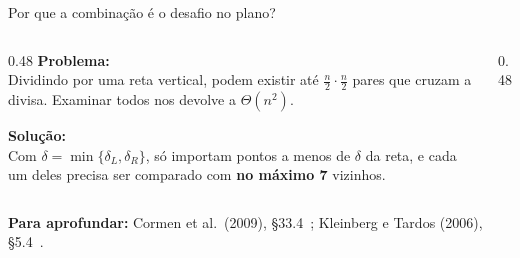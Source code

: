 \documentclass[aspectratio=169,xcolor=table]{beamer}
\newcommand{\pontosexemplo}{%
  \foreach \n/\x/\y/\p in {A/1/5/above left, B/2/9/above left, C/4/5/above left,
      D/5/8/above left, E/6/8/above right, F/8/8/above right, G/10/2/above left,
      H/11/9/above left}{%
    \node[pt] (\n) at (\x,\y) {};
    \node[ptlbl, \p] at (\n) {\n};
  }%
}
\newcommand{\fonte}[1]{%
  \vfill
  {\tiny\color{gray!55!black}\textbf{Para aprofundar:} #1\par}%
}
\begin{document}
\begin{frame}{Por que a combinação é o desafio no plano?}
  \begin{columns}[T]
    \begin{column}{0.48\textwidth}
      \textbf{Problema:}\\[2pt]
      {\scriptsize Dividindo por uma reta vertical, podem existir até
      $\frac n2\cdot\frac n2$ pares que cruzam a divisa. Examinar todos
      nos devolve a $\Theta(n^2)$.}

      \medskip
      \textbf{Solução:}\\[2pt]
      {\scriptsize Com $\delta=\min\{\delta_L,\delta_R\}$, só importam pontos
      a menos de $\delta$ da reta, e cada um deles precisa ser comparado
      com \textbf{no máximo 7} vizinhos.}
    \end{column}
    \begin{column}{0.48\textwidth}
      \centering
    \end{column}
  \end{columns}
  \fonte{Cormen et al.\ (2009), \S 33.4~\cite{cormen2009introduction};
    Kleinberg e Tardos (2006), \S 5.4~\cite{kleinberg2006algorithm}.}
\end{frame}
\end{document}

